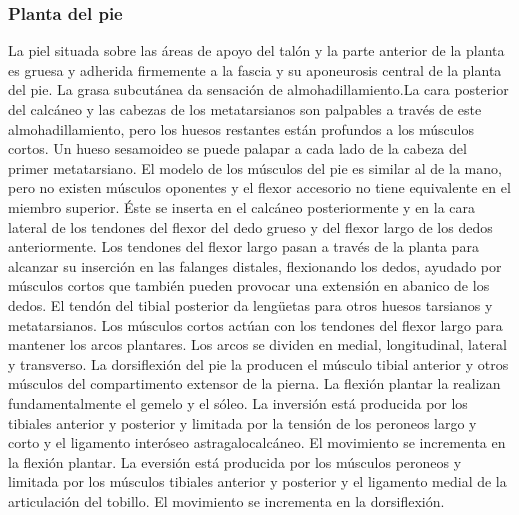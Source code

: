 \documentclass[a4paper,12pt]{article} %
\begin{document}
\begin{appendices}
\subsubsection{Planta del pie}
La piel situada sobre las áreas de apoyo del talón y la parte anterior de la planta es gruesa y adherida firmemente a la fascia y su aponeurosis central de la planta del pie. La grasa subcutánea da sensación de almohadillamiento.La cara posterior del calcáneo y las cabezas de los metatarsianos son palpables a través de este almohadillamiento, pero los huesos restantes están profundos a los músculos cortos. Un hueso sesamoideo se puede palapar a cada lado de la cabeza del primer metatarsiano. El modelo de los músculos del pie es similar al de la mano, pero no existen músculos oponentes y el flexor accesorio no tiene equivalente en el miembro superior. Éste se inserta en el calcáneo posteriormente y en la cara lateral de los tendones del flexor del dedo grueso y del flexor largo de los dedos anteriormente. Los tendones del flexor largo pasan a través de la planta para alcanzar su inserción en las falanges distales, flexionando los dedos, ayudado por músculos cortos que también pueden provocar una extensión en abanico de los dedos. El tendón del tibial posterior da lengüetas para otros huesos tarsianos y metatarsianos. Los músculos cortos actúan con los tendones del flexor largo para mantener los arcos plantares. Los arcos se dividen en medial, longitudinal, lateral y transverso.
La dorsiflexión del pie la producen el músculo tibial anterior y otros músculos del compartimento extensor de la pierna. La flexión plantar la realizan fundamentalmente el gemelo y el sóleo. La inversión está producida por los tibiales anterior y posterior y limitada por la tensión de los peroneos largo y corto y el ligamento interóseo astragalocalcáneo. El movimiento se incrementa en la flexión plantar. La eversión está producida por los músculos peroneos y limitada por los músculos tibiales anterior y posterior y el ligamento medial de la articulación del tobillo. El movimiento se incrementa en la dorsiflexión.
\end{appendices}
\end{document}
